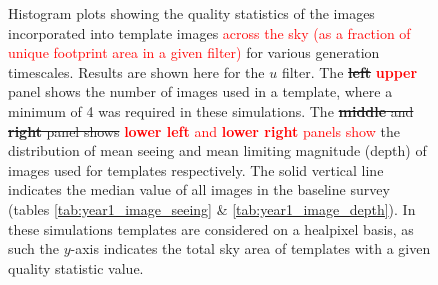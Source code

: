 \documentclass[preprintm,linenumbers]{aastex631}
\providecommand{\red}[1]{\textcolor{red}{#1}}
\begin{document}
\begin{figure}[h]
\begin{tabular}{@{}c@{}c@{}}
\end{tabular}
			\caption{
				Histogram plots showing the quality statistics of the images incorporated into template images \red{across the sky (as a fraction of unique footprint area in a given filter)} for various generation timescales.
				Results are shown here for the $u$ filter. 
				The \sout{\textbf{left}} \red{\textbf{upper}} panel shows the number of images used in a template, where a minimum of 4 was required in these simulations. %
				The \sout{\textbf{middle} and \textbf{right} panel shows} \red{\textbf{lower left} and \textbf{lower right} panels show} the distribution of mean seeing and mean limiting magnitude (depth) of images used for templates respectively.
				The solid vertical line indicates the median value of all images in the baseline survey (tables \ref{tab:year1_image_seeing} \& \ref{tab:year1_image_depth}).
				In these simulations templates are considered on a healpixel basis, as such the $y$-axis indicates the total sky area of templates with a given quality statistic value. \label{appendixa:1}
			}
		\end{figure}
		
\end{document}
